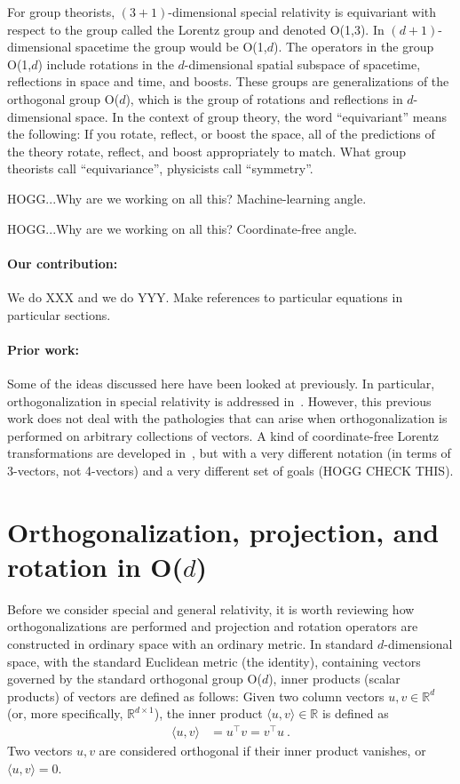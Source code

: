 \documentclass{article}
\newcommand{\inner}[2]{\langle{#1},{#2}\rangle}
\begin{document}
For group theorists, $(3+1)$-dimensional special relativity is equivariant with respect to the group called the Lorentz group and denoted O(1,3).
In $(d+1)$-dimensional spacetime the group would be O(1,$d$).
The operators in the group O(1,$d$) include rotations in the $d$-dimensional spatial subspace of spacetime, reflections in space and time, and boosts.
These groups are generalizations of the orthogonal group O($d$), which is the group of rotations and reflections in $d$-dimensional space.
In the context of group theory, the word ``equivariant'' means the following:
If you rotate, reflect, or boost the space, all of the predictions of the theory rotate, reflect, and boost appropriately to match.
What group theorists call ``equivariance'', physicists call ``symmetry''.

HOGG...Why are we working on all this? Machine-learning angle.

HOGG...Why are we working on all this? Coordinate-free angle.

\paragraph{Our contribution:}
We do XXX and we do YYY. Make references to particular equations in particular sections.

\paragraph{Prior work:}
Some of the ideas discussed here have been looked at previously.
In particular, orthogonalization in special relativity is addressed in~\cite{joot}.
However, this previous work does not deal with the pathologies that can arise when orthogonalization is performed on arbitrary collections of vectors.
A kind of coordinate-free Lorentz transformations are developed in~\cite{wagner}, but with a very different notation (in terms of 3-vectors, not 4-vectors) and a very different set of goals (HOGG CHECK THIS).

\section{Orthogonalization, projection, and rotation in O($d$)}\label{sec:od}

Before we consider special and general relativity, it is worth reviewing how orthogonalizations are performed and projection and rotation operators are constructed in ordinary space with an ordinary metric.
In standard $d$-dimensional space, with the standard Euclidean metric (the identity), containing vectors governed by the standard orthogonal group O($d$), inner products (scalar products) of vectors are defined as follows:
Given two column vectors $u,v\in\mathbb{R}^d$ (or, more specifically, $\mathbb{R}^{d\times1}$), the inner product $\inner{u}{v}\in\mathbb{R}$ is defined as
\begin{align}
    \inner{u}{v} &= u^\top v = v^\top u ~.
\end{align}
Two vectors $u,v$ are considered orthogonal if their inner product vanishes, or $\inner{u}{v}=0$.
\end{document}
